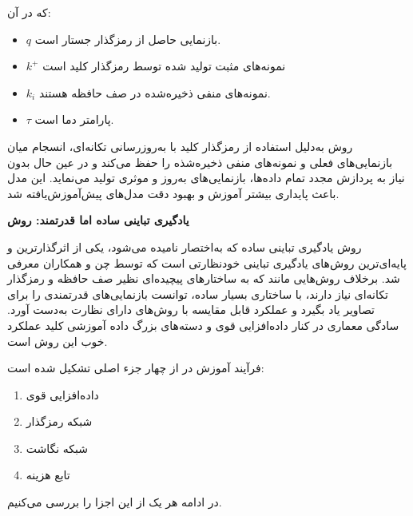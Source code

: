 که در آن:
\begin{itemize}
    \item $q$ بازنمایی حاصل از رمزگذار جستار است.
    \item $k^+$ نمونه‌های مثبت تولید شده توسط رمزگذار کلید است
    \item $k_i$ نمونه‌های منفی ذخیره‌شده در صف حافظه هستند.
    \item $\tau$ پارامتر دما است.
\end{itemize}
روش 
به‌دلیل استفاده از رمزگذار کلید با به‌روزرسانی تکانه‌ای، انسجام میان بازنمایی‌های فعلی و نمونه‌های منفی ذخیره‌شذه را حفظ می‌کند و در عین حال بدون نیاز به پردازش مجدد تمام داده‌ها، بازنمایی‌های به‌روز و موثری تولید می‌نماید. این مدل باعث پایداری بیشتر آموزش و بهبود دقت مدل‌های پیش‌آموزش‌یافته شد.\newline

\noindent\textbf{یادگیری تباینی ساده اما قدرتمند: روش }\label{sec:simclr}

روش یادگیری تباینی ساده که به‌اختصار
نامیده می‌شود، یکی از اثرگذارترین و پایه‌ای‌ترین روش‌های یادگیری تباینی خودنظارتی است که توسط
چن و همکاران\cite{chen2020simple}
معرفی شد. برخلاف روش‌هایی مانند
که به ساختارهای پیچیده‌ای نظیر صف حافظه و رمزگذار تکانه‌ای نیاز دارند،
با ساختاری بسیار ساده، توانست بازنمایی‌های قدرتمندی را برای تصاویر یاد بگیرد و عملکرد قابل مقایسه با روش‌های دارای نظارت به‌دست آورد. سادگی معماری در کنار داده‌افزایی قوی و دسته‌های بزرگ داده آموزشی کلید عملکرد خوب این روش است.

فرآیند آموزش در 
از چهار جزء اصلی تشکیل شده است:
\begin{enumerate}
    \item داده‌افزایی قوی
    \item شبکه رمزگذار
    \item شبکه نگاشت
    \item تابع هزینه 
\end{enumerate}

در ادامه هر یک از این اجزا را بررسی می‌کنیم.

